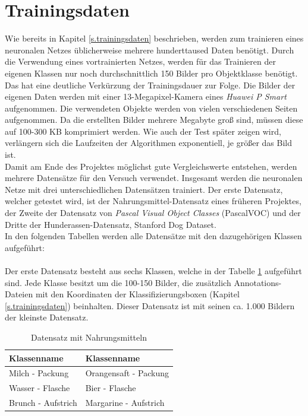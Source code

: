   \section{Trainingsdaten}\label{s.tdaten}
Wie bereits in Kapitel \ref{s.trainingsdaten} beschrieben, werden zum trainieren eines neuronalen Netzes üblicherweise mehrere hunderttaused Daten benötigt. Durch die Verwendung eines vortrainierten Netzes, werden für das Trainieren der eigenen Klassen nur noch durchschnittlich 150 Bilder pro Objektklasse benötigt. Das hat eine deutliche Verkürzung der Trainingsdauer zur Folge. Die Bilder der eigenen Daten werden mit einer 13-Megapixel-Kamera eines \textit{Huawei P Smart} aufgenommen. Die verwendeten Objekte werden von vielen verschiedenen Seiten aufgenommen. Da die erstellten Bilder mehrere Megabyte groß sind, müssen diese auf 100-300 KB komprimiert werden. Wie auch der Test später zeigen wird, verlängern sich die Laufzeiten der Algorithmen exponentiell, je größer das Bild ist.\\
Damit am Ende des Projektes möglichst gute Vergleichswerte entstehen, werden mehrere Datensätze für den Versuch verwendet. Insgesamt werden die neuronalen Netze mit drei unterschiedlichen Datensätzen trainiert. Der erste Datensatz, welcher getestet wird, ist der Nahrungsmittel-Datensatz eines früheren Projektes, der Zweite der Datensatz von \textit{Pascal Visual Object Classes} (PascalVOC) und der Dritte der Hunderassen-Datensatz, Stanford Dog Dataset.\\
In den folgenden Tabellen werden alle Datensätze mit den dazugehörigen Klassen aufgeführt:\\\\
Der erste Datensatz besteht aus sechs Klassen, welche in der Tabelle \ref{tab:nahrungsmittel} aufgeführt sind. Jede Klasse besitzt um die 100-150 Bilder, die zusätzlich Annotations-Dateien mit den Koordinaten der Klassifizierungsboxen (Kapitel \ref{s.trainingsdaten}) beinhalten. Dieser Datensatz ist mit seinen ca. 1.000 Bildern der kleinste Datensatz. 
\begin{table}
[h]
\caption{Datensatz mit Nahrungsmitteln}
\centering
\begin{tabular}{|l|l|}
\hline
Klassenname & Klassenname\\
\hline
Milch - Packung & Orangensaft - Packung\\
Wasser - Flasche & Bier - Flasche\\
Brunch - Aufstrich & Margarine - Aufstrich\\
\hline
\end{tabular}
\label{tab:nahrungsmittel}
\end{table}
